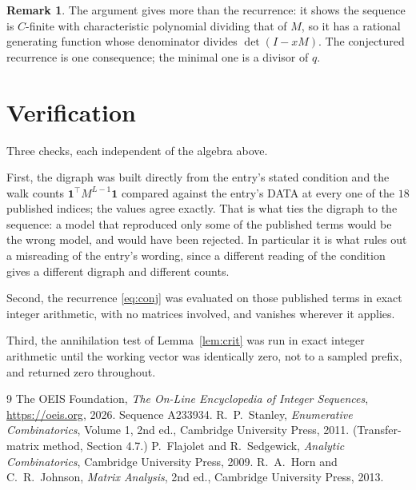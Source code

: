 \documentclass[11pt,a4paper]{article}
\theoremstyle{plain}
\theoremstyle{definition}
\newtheorem{remark}[theorem]{Remark}
\begin{document}
\begin{remark}
The argument gives more than the recurrence: it shows the sequence is $C$-finite with
characteristic polynomial dividing that of $M$, so it has a rational generating function
whose denominator divides $\det(I-xM)$. The conjectured recurrence is one consequence; the
minimal one is a divisor of $q$.
\end{remark}

\section{Verification}

Three checks, each independent of the algebra above.

First, the digraph was built directly from the entry's stated condition and the walk counts
$\mathbf{1}^{\!\top}M^{L-1}\mathbf{1}$ compared against the entry's DATA at
every one of the $18$ published indices; the values agree exactly. That is what ties
the digraph to the sequence: a model that reproduced only some of the published terms would
be the wrong model, and would have been rejected. In particular it is what rules out a
misreading of the entry's wording, since a different reading of the condition gives a
different digraph and different counts.

Second, the recurrence \eqref{eq:conj} was evaluated on those published terms in exact
integer arithmetic, with no matrices involved, and vanishes wherever it applies.

Third, the annihilation test of Lemma~\ref{lem:crit} was run in exact integer arithmetic
until the working vector was identically zero, not to a sampled prefix, and returned zero
throughout.

\begin{thebibliography}{9}
 The OEIS Foundation, \emph{The On-Line Encyclopedia of Integer
Sequences}, \url{https://oeis.org}, 2026. Sequence A233934.
 R.~P.~Stanley, \emph{Enumerative Combinatorics}, Volume 1, 2nd ed.,
Cambridge University Press, 2011. (Transfer-matrix method, Section 4.7.)
 P.~Flajolet and R.~Sedgewick, \emph{Analytic Combinatorics}, Cambridge
University Press, 2009.
 R.~A.~Horn and C.~R.~Johnson, \emph{Matrix Analysis}, 2nd ed., Cambridge
University Press, 2013.
\end{thebibliography}
\end{document}
